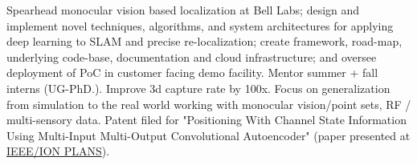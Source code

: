 \documentclass[]{deedy-resume-openfont}
\begin{document}
\begin{minipage}[t]{0.58\textwidth} 



\vspace{-0.1cm} %
 \newline





Spearhead monocular vision based localization at Bell Labs; design and implement novel techniques, algorithms, and  system architectures for applying deep learning to SLAM and precise re-localization; create framework, road-map, underlying code-base, documentation and cloud infrastructure; and oversee deployment of PoC in customer facing demo facility. Mentor summer + fall interns (UG-PhD.). Improve 3d capture rate by 100x. Focus on generalization from simulation to the real world working with monocular vision/point sets,  RF / multi-sensory data. Patent filed for "Positioning With Channel State Information Using Multi-Input Multi-Output Convolutional Autoencoder" (paper presented at \href{https://www.ion.org/plans/abstracts.cfm?paperID=8295}{IEEE/ION PLANS}).


\sectionseplg





\end{minipage}
\end{document}
